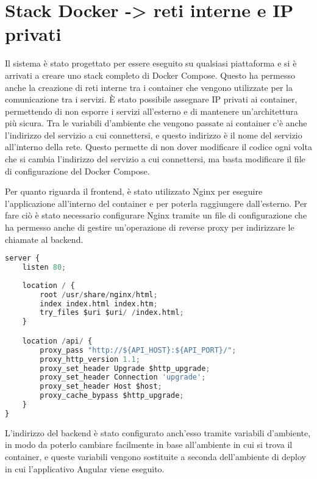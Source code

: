 \section{Stack Docker -> reti interne e IP privati}

Il sistema è stato progettato per essere eseguito su qualsiasi piattaforma e si è arrivati a creare uno stack completo di Docker Compose. Questo ha permesso anche la creazione di reti interne tra i container che vengono utilizzate per la comunicazione tra i servizi. È stato possibile assegnare IP privati ai container, permettendo di non esporre i servizi all'esterno e di mantenere un'architettura più sicura. Tra le variabili d'ambiente che vengono passate ai container c'è anche l'indirizzo del servizio a cui connettersi, e questo indirizzo è il nome del servizio all'interno della rete. Questo permette di non dover modificare il codice ogni volta che si cambia l'indirizzo del servizio a cui connettersi, ma basta modificare il file di configurazione del Docker Compose.

Per quanto riguarda il frontend, è stato utilizzato Nginx per eseguire l'applicazione all'interno del container e per poterla raggiungere dall'esterno. Per fare ciò è stato necessario configurare Nginx tramite un file di configurazione che ha permesso anche di gestire un'operazione di reverse proxy per indirizzare le chiamate al backend.

\begin{lstlisting}[language=Python, caption={Configurazione Nginx del front-end}, label=list:nginx_frontend]
server {
    listen 80;
    
    location / {
        root /usr/share/nginx/html;
        index index.html index.htm;
        try_files $uri $uri/ /index.html;
    }

    location /api/ {
        proxy_pass "http://${API_HOST}:${API_PORT}/";
        proxy_http_version 1.1;
        proxy_set_header Upgrade $http_upgrade;
        proxy_set_header Connection 'upgrade';
        proxy_set_header Host $host;
        proxy_cache_bypass $http_upgrade;
    }
}
\end{lstlisting}

L'indirizzo del backend è stato configurato anch'esso tramite variabili d'ambiente, in modo da poterlo cambiare facilmente in base all'ambiente in cui si trova il container, e queste variabili vengono sostituite a seconda dell'ambiente di deploy in cui l'applicativo Angular viene eseguito.


